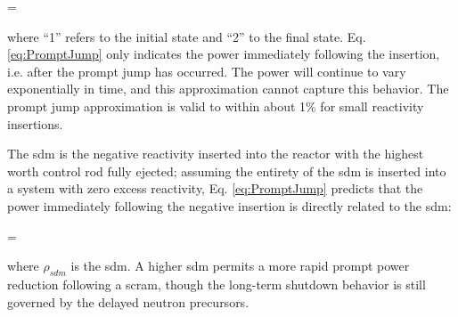 \beq
\label{eq:PromptJump}
=
\eeq

where ``1'' refers to the initial state and ``2'' to the final state. Eq. \eqref{eq:PromptJump} only indicates the power immediately following the insertion, i.e. after the prompt jump has occurred. The power will continue to vary exponentially in time, and this approximation cannot capture this behavior. The prompt jump approximation is valid to within about 1\% for small reactivity insertions.

The \gls{sdm} is the negative reactivity inserted into the reactor with the highest worth control rod fully ejected; assuming the entirety of the \gls{sdm} is inserted into a system with zero excess reactivity, Eq. \eqref{eq:PromptJump} predicts that the power immediately following the negative insertion is directly related to the \gls{sdm}:

\beq
{}=
\eeq

where \(\rho_{sdm}\) is the \gls{sdm}. A higher \gls{sdm} permits a more rapid prompt power reduction following a scram, though the long-term shutdown behavior is still governed by the delayed neutron precursors.